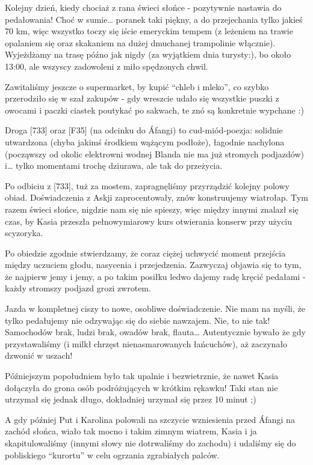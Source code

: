Kolejny dzień, kiedy chociaż z rana świeci słońce - pozytywnie nastawia do pedałowania! Choć w sumie… poranek taki piękny, a do przejechania tylko jakieś 70 km, więc wszystko toczy się iście emeryckim tempem (z leżeniem na trawie opalaniem się oraz skakaniem na dużej dmuchanej trampolinie włącznie). Wyjeżdżamy na trasę późno jak nigdy (za wyjątkiem dnia turysty:), bo około 13:00, ale wszyscy zadowoleni z miło spędzonych chwil.

Zawitaliśmy jeszcze o supermarket, by kupić “chleb i mleko”, co szybko przerodziło się w szał zakupów - gdy wreszcie udało się wszystkie puszki z owocami i paczki ciastek poutykać po sakwach, te znó są konkretnie wypchane :)

Droga [733] oraz [F35] (na odcinku do Áfangi) to cud-miód-poezja: solidnie utwardzona (chyba jakimś środkiem wążącym podłoże), łagodnie nachylona (począwszy od okolic elektrowni wodnej Blanda nie ma już stromych podjazdów) i… tylko momentami trochę dziurawa, ale tak do przeżycia.

Po odbiciu z [733], tuż za mostem, zapragnęliśmy przyrządzić kolejny polowy obiad. Doświadczenia z Askji zaprocentowały, znów konstruujemy wiatrołap. Tym razem świeci słońce, nigdzie nam się nie spieszy, więc między innymi znalazł się czas, by Kasia przeszła pełnowymiarowy kurs otwierania konserw przy użyciu scyzoryka.

Po obiedzie zgodnie stwierdzamy, że coraz ciężej uchwycić moment przejścia między uczuciem głodu, nasycenia i przejedzenia. Zazwyczaj objawia się to tym, że najpierw jemy i jemy, a po takim posiłku ledwo dajemy radę kręcić pedałami - każdy stromszy podjazd grozi zwrotem.

Jazda w kompletnej ciszy to nowe, osobliwe doświadczenie. Nie mam na myśli, że tylko pedałujemy nie odzywając się do siebie nawzajem. Nie, to nie tak! Samochodów brak, ludzi brak, owadów brak, flauta… Autentycznie bywało że gdy przystawaliśmy (i milkł chrzęst nienasmarowanych łańcuchów), aż zaczynało dzwonić w uszach!

Późniejszym popołudniem było tak upalnie i bezwietrznie, że nawet Kasia dołączyła do grona osób podróżujących w krótkim rękawku! Taki stan nie utrzymał się jednak długo, dokładniej urzymał się przez 10 minut ;)

A gdy później Put i Karolina polowali na szczycie wzniesienia przed Áfangi na zachód słońca, wiało tak mocno i takim zimnym wiatrem, Kasia i ja skapitulowaliśmy (innymi słowy nie dotrwaliśmy do zachodu) i udaliśmy się do pobliskiego “kurortu” w celu ogrzania zgrabiałych palców.

